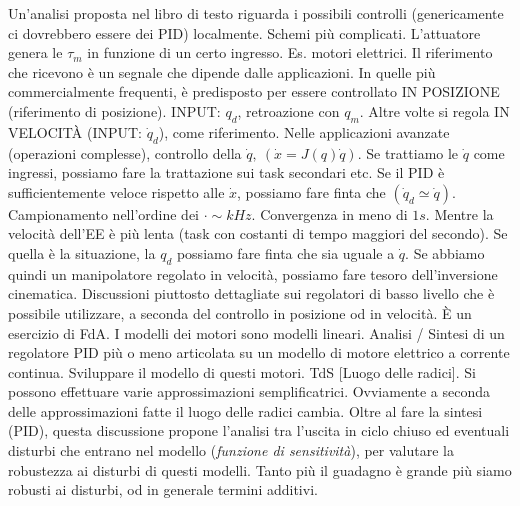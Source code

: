 Un'analisi proposta nel libro di testo riguarda i possibili controlli (genericamente ci dovrebbero essere dei PID) localmente. Schemi più complicati. L'attuatore genera le $\tau_m$ in funzione di un certo ingresso. Es. motori elettrici. Il riferimento che ricevono è un segnale che dipende dalle applicazioni. In quelle più commercialmente frequenti, è predisposto per essere controllato IN POSIZIONE (riferimento di posizione). INPUT: $q_d$, retroazione con $q_m$. Altre volte si regola IN VELOCIT\`A (INPUT: $\dot{q}_d$), come riferimento. Nelle applicazioni avanzate (operazioni complesse), controllo della $\dot{q},\ (\dot{x}=J(q)\dot{q})$. Se trattiamo le $\dot{q}$ come ingressi, possiamo fare la trattazione sui task secondari etc. Se il PID è sufficientemente veloce rispetto alle $\dot{x}$, possiamo fare finta che $(\dot{q}_d\simeq \dot{q})$. Campionamento nell'ordine dei $\mathord{\cdot}\sim kHz$. Convergenza in meno di $1s$. Mentre la velocità dell'EE è più lenta (task con costanti di tempo maggiori del secondo). Se quella è la situazione, la $q_d$ possiamo fare finta che sia uguale a $\dot{q}$. Se abbiamo quindi un manipolatore regolato in velocità, possiamo fare tesoro dell'inversione cinematica. Discussioni piuttosto dettagliate sui regolatori di basso livello che è possibile utilizzare, a seconda del controllo in posizione od in velocità. \`E un esercizio di FdA. I modelli dei motori sono modelli lineari. Analisi / Sintesi di un regolatore PID più o meno articolata su un modello di motore elettrico a corrente continua. Sviluppare il modello di questi motori. TdS [Luogo delle radici]. Si possono effettuare varie approssimazioni semplificatrici. Ovviamente a seconda delle approssimazioni fatte il luogo delle radici cambia. Oltre al fare la sintesi (PID), questa discussione propone l'analisi tra l'uscita in ciclo chiuso ed eventuali disturbi che entrano nel modello (\textit{funzione di sensitività}), per valutare la robustezza ai disturbi di questi modelli. Tanto più il guadagno è grande più siamo robusti ai disturbi, od in generale termini additivi.

